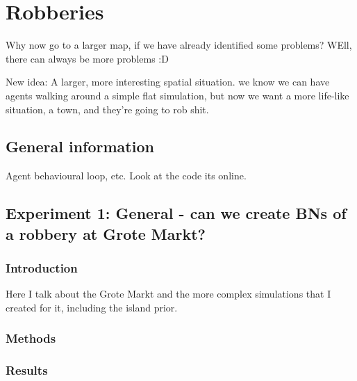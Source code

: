  

\chapter[Robberies in real locations]{Robberies}


Why now go to a larger map, if we have already identified some problems? WEll, there can always be more problems :D 


New idea: A  larger, more interesting spatial situation. we know we can have agents walking around a simple flat simulation, but now we want a more life-like situation, a town, and they're going to rob shit.


\section{General information}


Agent behavioural loop, etc. Look at the code its online.




\section{Experiment 1: General - can we create BNs of a robbery at Grote Markt?}
\subsection{Introduction}
Here I talk about the Grote Markt and the more complex simulations that I created for it, including the island prior.

\subsection{Methods}

\subsection{Results}

